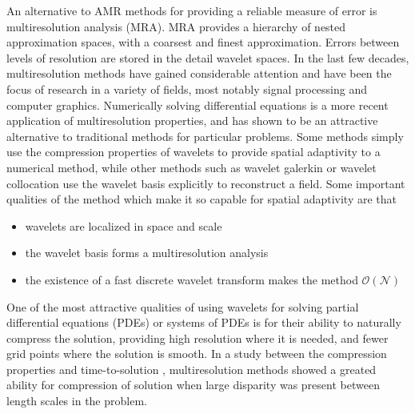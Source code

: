 \documentclass[10.5pt]{article}
\begin{document}
An alternative to AMR methods for providing a reliable measure of error is multiresolution analysis (MRA). MRA provides a hierarchy 
of nested approximation spaces, with a coarsest and finest approximation. Errors between levels of resolution are stored in the detail
wavelet spaces. In the last few decades, multiresolution methods have gained considerable attention and have been the focus
of research in a variety of fields, most notably signal processing and computer graphics.
Numerically solving differential equations is a more recent application of multiresolution properties, and has shown
to be an attractive alternative to traditional methods for particular problems. Some methods simply use the compression properties
of wavelets to provide spatial adaptivity to a numerical method, while other methods such as wavelet galerkin or wavelet collocation
use the wavelet basis explicitly to reconstruct a field. Some important qualities of the method which make it so capable 
for spatial adaptivity are that
\begin{itemize}
    \item wavelets are localized in space and scale
    \item the wavelet basis forms a multiresolution analysis
    \item the existence of a fast discrete wavelet transform makes the method $\mathcal{O}(\mathcal{N})$
\end{itemize} 
One of the most attractive qualities of using wavelets for solving partial differential equations (PDEs) 
or systems of PDEs is for their ability to naturally compress the solution, providing high resolution where 
it is needed, and fewer grid points where the solution is smooth. In a study between the compression properties and 
time-to-solution \cite{amr_vs_mra}, multiresolution methods showed a greated ability for compression of solution when
large disparity was present between length scales in the problem.

\end{document}

